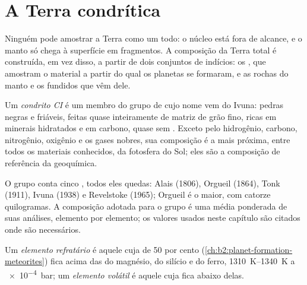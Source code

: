 \section{A Terra condrítica}

Ninguém pode amostrar a Terra como um todo: o núcleo está fora de alcance, e o
manto só chega à superfície em fragmentos. A composição da Terra total é
construída, em vez disso, a partir de dois conjuntos de indícios: os , que amostram o
material a partir do qual os planetas se formaram, e as rochas do manto e os
fundidos que vêm dele.

\begin{definition}[Condrito CI]\label{def:b2:elements-in-the-earth:ci}
Um \emph{condrito CI} é um membro do grupo de
 cujo nome vem do  Ivuna: pedras negras e friáveis,
feitas quase inteiramente de matriz de grão fino, ricas em minerais hidratados e
em carbono, quase sem . Exceto pelo hidrogênio, carbono, nitrogênio, oxigênio e os
gases nobres, sua composição é a mais próxima, entre todos os materiais conhecidos, da
fotosfera do Sol; eles são a composição de referência da geoquímica.
\end{definition}

O grupo conta cinco , todos eles quedas: Alais (1806), Orgueil
(1864), Tonk (1911), Ivuna (1938) e Revelstoke (1965); Orgueil é o maior,
com catorze quilogramas. A composição adotada para o grupo é uma média ponderada
de suas análises, elemento por elemento; os valores usados neste capítulo são
citados onde são necessários.

\begin{definition}
\label{def:b2:elements-in-the-earth:volatility}
Um \emph{elemento refratário} é aquele cuja 
de 50 por cento (\cref{ch:b2:planet-formation-meteorites}) fica acima
das do magnésio, do silício e do ferro, \qtyrange{1310}{1340}{K} a
\qty{e-4}{bar}; um
\emph{elemento volátil} é aquele cuja 
fica abaixo delas.
\end{definition}

